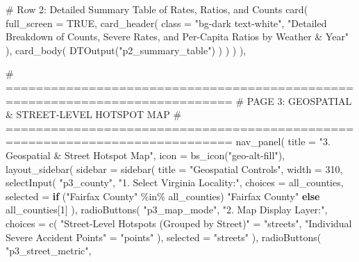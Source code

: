 \documentclass[
  letterpaper,
  DIV=11,
  numbers=noendperiod]{scrartcl}
\newenvironment{Shaded}{\begin{snugshade}}{\end{snugshade}}
\newcommand{\AttributeTok}[1]{\textcolor[rgb]{0.40,0.45,0.13}{#1}}
\newcommand{\CommentTok}[1]{\textcolor[rgb]{0.37,0.37,0.37}{#1}}
\newcommand{\ConstantTok}[1]{\textcolor[rgb]{0.56,0.35,0.01}{#1}}
\newcommand{\ControlFlowTok}[1]{\textcolor[rgb]{0.00,0.23,0.31}{\textbf{#1}}}
\newcommand{\DecValTok}[1]{\textcolor[rgb]{0.68,0.00,0.00}{#1}}
\newcommand{\FunctionTok}[1]{\textcolor[rgb]{0.28,0.35,0.67}{#1}}
\newcommand{\NormalTok}[1]{\textcolor[rgb]{0.00,0.23,0.31}{#1}}
\newcommand{\OtherTok}[1]{\textcolor[rgb]{0.00,0.23,0.31}{#1}}
\newcommand{\SpecialCharTok}[1]{\textcolor[rgb]{0.37,0.37,0.37}{#1}}
\newcommand{\StringTok}[1]{\textcolor[rgb]{0.13,0.47,0.30}{#1}}
\begin{document}
\begin{Shaded}
\begin{Highlighting}[]
      \CommentTok{\# Row 2: Detailed Summary Table of Rates, Ratios, and Counts}
      \FunctionTok{card}\NormalTok{(}
        \AttributeTok{full\_screen =} \ConstantTok{TRUE}\NormalTok{,}
        \FunctionTok{card\_header}\NormalTok{(}
          \AttributeTok{class =} \StringTok{"bg{-}dark text{-}white"}\NormalTok{,}
          \StringTok{"Detailed Breakdown of Counts, Severe Rates, and Per{-}Capita Ratios by Weather \& Year"}
\NormalTok{        ),}
        \FunctionTok{card\_body}\NormalTok{(}
          \FunctionTok{DTOutput}\NormalTok{(}\StringTok{"p2\_summary\_table"}\NormalTok{)}
\NormalTok{        )}
\NormalTok{      )}
\NormalTok{    )}
\NormalTok{  ),}

  \CommentTok{\# ============================================================================}
  \CommentTok{\# PAGE 3: GEOSPATIAL \& STREET{-}LEVEL HOTSPOT MAP}
  \CommentTok{\# ============================================================================}
  \FunctionTok{nav\_panel}\NormalTok{(}
    \AttributeTok{title =} \StringTok{"3. Geospatial \& Street Hotspot Map"}\NormalTok{,}
    \AttributeTok{icon =} \FunctionTok{bs\_icon}\NormalTok{(}\StringTok{"geo{-}alt{-}fill"}\NormalTok{),}
    \FunctionTok{layout\_sidebar}\NormalTok{(}
      \AttributeTok{sidebar =} \FunctionTok{sidebar}\NormalTok{(}
        \AttributeTok{title =} \StringTok{"Geospatial Controls"}\NormalTok{,}
        \AttributeTok{width =} \DecValTok{310}\NormalTok{,}
        \FunctionTok{selectInput}\NormalTok{(}
          \StringTok{"p3\_county"}\NormalTok{,}
          \StringTok{"1. Select Virginia Locality:"}\NormalTok{,}
          \AttributeTok{choices =}\NormalTok{ all\_counties,}
          \AttributeTok{selected =} \ControlFlowTok{if}\NormalTok{ (}\StringTok{"Fairfax County"} \SpecialCharTok{\%in\%}\NormalTok{ all\_counties) }\StringTok{"Fairfax County"} \ControlFlowTok{else}\NormalTok{ all\_counties[}\DecValTok{1}\NormalTok{]}
\NormalTok{        ),}
        \FunctionTok{radioButtons}\NormalTok{(}
          \StringTok{"p3\_map\_mode"}\NormalTok{,}
          \StringTok{"2. Map Display Layer:"}\NormalTok{,}
          \AttributeTok{choices =} \FunctionTok{c}\NormalTok{(}
            \StringTok{"Street{-}Level Hotspots (Grouped by Street)"} \OtherTok{=} \StringTok{"streets"}\NormalTok{,}
            \StringTok{"Individual Severe Accident Points"}         \OtherTok{=} \StringTok{"points"}
\NormalTok{          ),}
          \AttributeTok{selected =} \StringTok{"streets"}
\NormalTok{        ),}
        \FunctionTok{radioButtons}\NormalTok{(}
          \StringTok{"p3\_street\_metric"}\NormalTok{,}

\end{Highlighting}
\end{Shaded}
\end{document}
